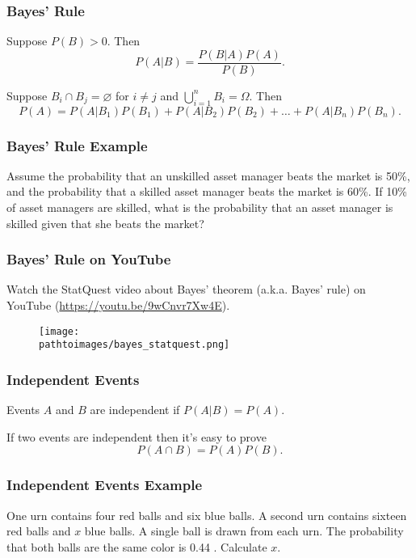 \documentclass{beamer}
\newcommand{\pathtoimages}{/Users/charlesrambo/Desktop/Bootcamp24/Images}
\begin{document}
\begin{frame}
\frametitle{Bayes' Rule}

\begin{Theorem}[Bayes]
Suppose $P(B) > 0$. Then
$$
P(A|B) = \frac{P(B|A) P(A)}{P(B)}.
$$
\end{Theorem}

\begin{Theorem}
Suppose $B_i \cap B_j = \varnothing$ for $i\neq j$ and $\displaystyle\bigcup_{i = 1}^n B_i = \Omega$. Then
$$
P(A) = P(A|B_1) P(B_1) + P(A|B_2)P(B_2) + \ldots + P(A|B_n) P(B_n).
$$
\end{Theorem}

\end{frame}

\begin{frame}[t]
\frametitle{Bayes' Rule Example}
\small
\begin{Example}
Assume the probability that an unskilled asset manager beats the market is 50\%, and the probability that a skilled asset manager beats the market is 60\%. If 10\% of asset managers are skilled, what is the probability that an asset manager is skilled given that she beats the market?
\end{Example}

\end{frame}

\begin{frame}
\frametitle{Bayes' Rule on YouTube}
Watch the StatQuest video about Bayes' theorem (a.k.a. Bayes' rule) on YouTube (\url{https://youtu.be/9wCnvr7Xw4E}).
\begin{figure}
\centering
\texttt{[image: \\pathtoimages/bayes\_statquest.png]}
\end{figure}

\end{frame}

\begin{frame}
\frametitle{Independent Events}

\begin{Definition}
Events $A$ and $B$ are independent if $P(A|B) = P(A)$.
\end{Definition}
If two events are independent then it's easy to prove
$$
P(A\cap B) = P(A) P(B).
$$
\end{frame}

\begin{frame}[t]
\frametitle{Independent Events Example}
\small
\begin{Example}
One urn contains four red balls and six blue balls. A second urn contains sixteen red balls and $x$ blue balls. A single ball is drawn from each urn. The probability that both balls are the same color is 0.44 . Calculate $x$.
\end{Example}

\end{frame}
\end{document}
